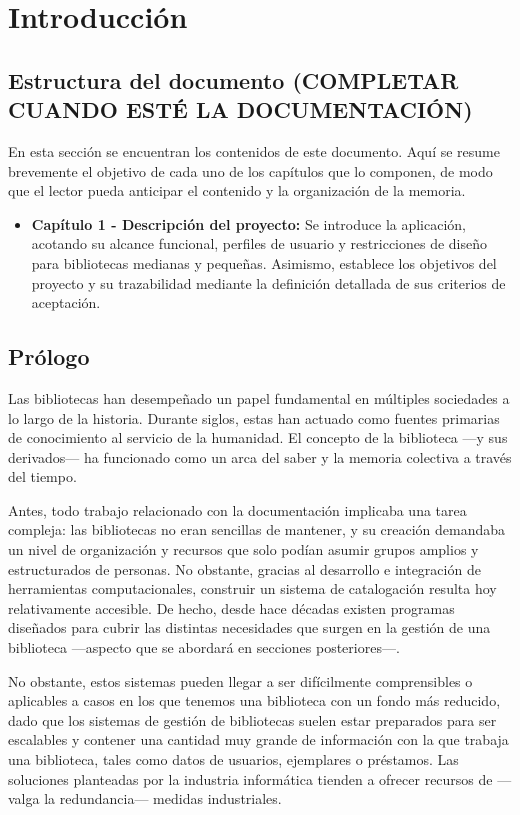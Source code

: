 
\chapter{Introducción}


\section{Estructura del documento (COMPLETAR CUANDO ESTÉ LA DOCUMENTACIÓN)}
En esta sección se encuentran los contenidos de este documento. Aquí se resume brevemente el objetivo de cada uno de los capítulos que lo componen, de modo que el lector pueda anticipar el contenido y la organización de la memoria.
\begin{itemize}
	\item \textbf{Capítulo 1 - Descripción del proyecto:} Se introduce la aplicación, acotando su alcance funcional, perfiles de usuario y restricciones de diseño para bibliotecas medianas y pequeñas. Asimismo, establece los objetivos del proyecto y su trazabilidad mediante la definición detallada de sus criterios de aceptación.
\end{itemize}

\section{Prólogo}
Las bibliotecas han desempeñado un papel fundamental en múltiples sociedades a lo largo de la historia. Durante siglos, estas han actuado como fuentes primarias de conocimiento al servicio de la humanidad. El concepto de la biblioteca —y sus derivados— ha funcionado como un arca del saber y la memoria colectiva a través del tiempo.

Antes, todo trabajo relacionado con la documentación implicaba una tarea compleja: las bibliotecas no eran sencillas de mantener, y su creación demandaba un nivel de organización y recursos que solo podían asumir grupos amplios y estructurados de personas. No obstante, gracias al desarrollo e integración de herramientas computacionales, construir un sistema de catalogación resulta hoy relativamente accesible. De hecho, desde hace décadas existen programas diseñados para cubrir las distintas necesidades que surgen en la gestión de una biblioteca —aspecto que se abordará en secciones posteriores—.

No obstante, estos sistemas pueden llegar a ser difícilmente comprensibles o aplicables a casos en los que tenemos una biblioteca con un fondo más reducido, dado que los sistemas de gestión de bibliotecas suelen estar preparados para ser escalables y contener una cantidad muy grande de información con la que trabaja una biblioteca, tales como datos de usuarios, ejemplares o préstamos. Las soluciones planteadas por la industria informática tienden a ofrecer recursos de —valga la redundancia— medidas industriales.


